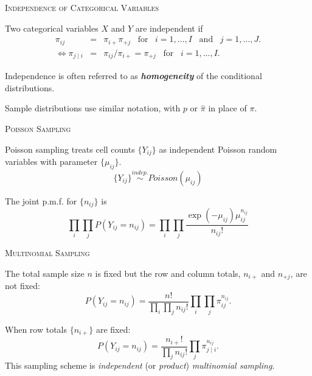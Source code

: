 \documentclass[dvipdfmx, serif,handout]{beamer}
\begin{document}
\begin{frame}{\textsc{Independence of Categorical Variables}}

	\bi
	\item Two categorical variables $X$ and $Y$ are independent if
	\begin{eqnarray*}
		\pi_{ij} &=& \pi_{i+}\pi_{+j}\;\;\; \mbox{for}\;\;\; i=1,\ldots, I\;\;\;\mbox{and}\;\;\; j=1,\ldots,J. \\
		\Leftrightarrow \pi_{j \mid i} &=& \pi_{ij}/\pi_{i+}=\pi_{+j}\;\;\; \mbox{for}\;\;\; i=1,\ldots, I.
	\end{eqnarray*}
	\item Independence is often referred to as {\bf{\em homogeneity}} of the conditional distributions.
	\item Sample distributions use similar notation, with $p$ or $\hat{\pi}$ in place of $\pi$.
	\ei

\end{frame}
\begin{frame}{\textsc{Poisson Sampling}}

	\bi
	\item Poisson sampling treats cell counts $\{Y_{ij}\}$ as independent Poisson random variables with parameter $\{\mu_{ij}\}$.
	$$\{Y_{ij}\} \stackrel{indep.}{\sim} Poisson(\mu_{ij})$$
	\item The joint p.m.f. for $\{n_{ij}\}$ is
	$$\prod_i \prod_jP(Y_{ij}=n_{ij}) = \prod_i \prod_j \frac{\exp(-\mu_{ij})\mu_{ij}^{n_{ij}}}{n_{ij}!}$$
	\ei

\end{frame}
\begin{frame}{\textsc{Multinomial Sampling}}

	\bi
	\item The total sample size $n$ is fixed but the row and column totals, $n_{i+}$ and $n_{+j}$, are not fixed:
	{\small
	$$P(Y_{ij}=n_{ij}) = \frac{n!}{\prod_i \prod_j n_{ij}!} \prod_i \prod_j \pi_{ij}^{n_{ij}}.$$
	}
	\item When row totals $\{n_{i+}\}$ are fixed:
	{\small
	$$P(Y_{ij}=n_{ij}) = \frac{n_{i+}!}{\prod_j n_{ij}!} \prod_j \pi_{j \mid i}^{n_{ij}}.$$
	}
	This sampling scheme is {\it independent} (or {\it product}) {\it multinomial sampling}.
	\ei

\end{frame}
\end{document}
